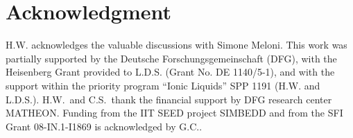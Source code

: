 \documentclass[a4paper,preprint,unsortedaddress,onecolumn]{revtex4-1}
\begin{document}
\section*{Acknowledgment}
  H.W. acknowledges the valuable discussions with Simone Meloni.
  This work was partially supported by the Deutsche
  Forschungsgemeinschaft (DFG), with the Heisenberg
  Grant provided to L.D.S. (Grant No. DE 1140/5-1),
  and with the support within the priority program ``Ionic Liquids'' SPP 1191
  (H.W. and L.D.S.). 
  H.W.~and C.S.~thank the financial support by DFG research center MATHEON.
  Funding from the IIT SEED project SIMBEDD and from the SFI Grant 08-IN.1-I1869 is acknowledged by G.C..

{}









\end{document}
